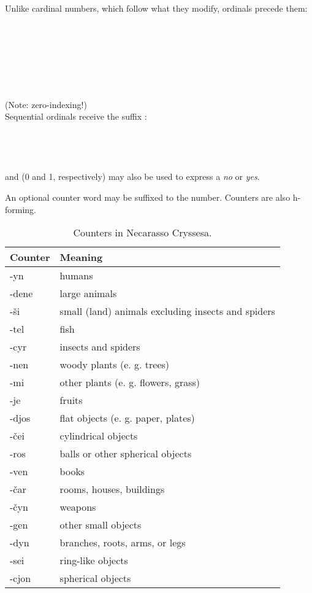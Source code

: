 \documentclass{book}
\begin{document}
Unlike cardinal numbers, which follow what they modify, ordinals precede them: \\
~\\
  \\
  \\
  \\
~\\
  \\
  \\
  (Note: zero-indexing!) \\

Sequential ordinals receive the suffix : \\
~\\
    \\
    \\
    \\

 and  (0 and 1, respectively) may also be used to express a \emph{no} or \emph{yes}.

An optional counter word may be suffixed to the number. Counters are also h-forming.

\begin{table}[h]
  \caption{Counters in Necarasso Cryssesa.}
  \centering
	\begin{tabular}{|l|l|}
	  \hline
	  Counter & Meaning \\ \hline
	  -yn & humans \\
	  -dene & large animals \\
	  -ši & small (land) animals excluding insects and spiders \\
	  -tel & fish \\
	  -cyr & insects and spiders \\
	  -nen & woody plants (e. g. trees) \\
	  -mi & other plants (e. g. flowers, grass) \\
	  -je & fruits \\
	  -djos & flat objects (e. g. paper, plates) \\
	  -čei & cylindrical objects \\
	  -ros & balls or other spherical objects \\
	  -ven & books \\
	  -čar & rooms, houses, buildings \\
	  -čyn & weapons \\
	  -gen & other small objects \\
	  -dyn & branches, roots, arms, or legs \\
	  -sei & ring-like objects \\
	  -cjon & spherical objects \\ \hline
	\end{tabular}
\end{table}
\end{document}
